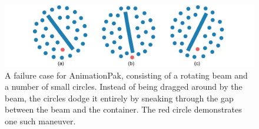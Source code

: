 \makeatletter %
\setlength{\@fptop}{0pt} %
\makeatother %
\begin{figure}[t]
\centering
\includegraphics[width=1.0\textwidth]{figures/animationpak/blender.pdf} 
\caption[A failure case for AnimationPak]
{\label{fig_animationpak_blender} 
A failure case for AnimationPak, consisting of 
a rotating beam and a number of small circles.  Instead of being dragged
around by the beam, the circles dodge it entirely by sneaking through
the gap between the beam and the container.
The red circle demonstrates one such maneuver.
}
\end{figure}







